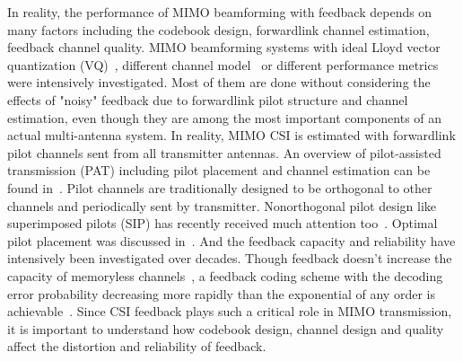 \documentclass[10pt,fleqn, twocolumn]{IEEEtran}
\begin{document}
In reality, the performance of MIMO beamforming with feedback
depends on many factors including the codebook design, forwardlink
channel estimation, feedback channel quality. MIMO beamforming
systems with ideal Lloyd vector quantization (VQ)~\cite{Narula98},
different channel model~\cite{Mukka03} or different performance
metrics~\cite{PXia04,Roh04} were intensively investigated. Most of
them are done without considering the effects of "noisy" feedback
due to forwardlink pilot structure and channel estimation, even
though they are among the most important components of an actual
multi-antenna system. In reality, MIMO CSI is estimated with
forwardlink pilot channels sent from all transmitter antennas. An
overview of pilot-assisted transmission (PAT) including pilot
placement and channel estimation can be found in~\cite{Tong04}.
Pilot channels are traditionally designed to be orthogonal to
other channels and periodically sent by transmitter. Nonorthogonal
pilot design like superimposed pilots (SIP) has recently received
much attention too~\cite{Coldrey06}. Optimal pilot placement was
discussed in~\cite{Dong02}. And the feedback capacity and
reliability have intensively been investigated over decades.
Though feedback doesn't increase the capacity of memoryless
channels~\cite{Shannon56,Kim06}, a feedback coding scheme with the
decoding error probability decreasing more rapidly than the
exponential of any order is achievable~\cite{Kramer69}. Since CSI
feedback plays such a critical role in MIMO transmission, it is
important to understand how codebook design, channel design and
quality affect the distortion and reliability of feedback.
\end{document}
